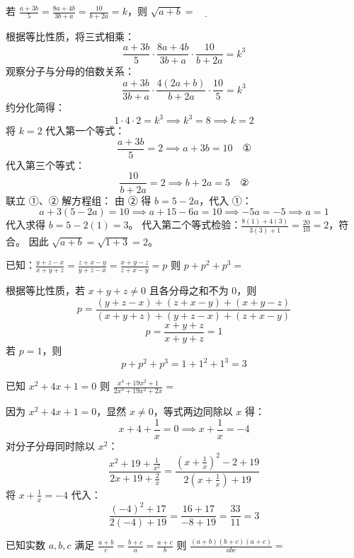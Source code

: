 \begin{questions}
\question
若 $\frac{a + 3b}{5} = \frac{8a + 4b}{3b + a} = \frac{10}{b + 2a} = k$，则 $\sqrt{a + b} = \underline{\qquad}$

\begin{solution}
根据等比性质，将三式相乘：
\[
\frac{a + 3b}{5} \cdot \frac{8a + 4b}{3b + a} \cdot \frac{10}{b + 2a} = k^3
\]
观察分子与分母的倍数关系：
\[
\frac{a + 3b}{3b + a} \cdot \frac{4(2a + b)}{b + 2a} \cdot \frac{10}{5} = k^3
\]
约分化简得：
\[
1 \cdot 4 \cdot 2 = k^3 \implies k^3 = 8 \implies k = 2
\]
将 $k = 2$ 代入第一个等式：
\[
\frac{a + 3b}{5} = 2 \implies a + 3b = 10 \quad \text{①}
\]
代入第三个等式：
\[
\frac{10}{b + 2a} = 2 \implies b + 2a = 5 \quad \text{②}
\]
联立 ①、② 解方程组：
由 ② 得 $b = 5 - 2a$，代入 ①：
\[
a + 3(5 - 2a) = 10 \implies a + 15 - 6a = 10 \implies -5a = -5 \implies a = 1
\]
代入求得 $b = 5 - 2(1) = 3$。
代入第二个等式检验：$\frac{8(1) + 4(3)}{3(3) + 1} = \frac{20}{10} = 2$，符合。
因此 $\sqrt{a + b} = \sqrt{1 + 3} = 2$。
\end{solution}

\question 已知：$\frac{y+z-x}{x+y+z} = \frac{z+x-y}{y+z-x} = \frac{x+y-z}{z+x-y} = p$
则 $p + p^2 + p^3 =$ \underline{\hspace{1cm}}

\begin{solution}
根据等比性质，若 $x+y+z \neq 0$ 且各分母之和不为 0，则
\[
p = \frac{(y+z-x) + (z+x-y) + (x+y-z)}{(x+y+z) + (y+z-x) + (z+x-y)}
\]
\[
p = \frac{x+y+z}{x+y+z} = 1
\]
若 $p = 1$，则
\[
p + p^2 + p^3 = 1 + 1^2 + 1^3 = 3
\]
\end{solution}

\question 已知 $x^2 + 4x + 1 = 0$
则 $\frac{x^4 + 19x^2 + 1}{2x^3 + 19x^2 + 2x} =$ \underline{\hspace{1cm}}

\begin{solution}
因为 $x^2 + 4x + 1 = 0$，显然 $x \neq 0$，等式两边同除以 $x$ 得：
\[
x + 4 + \frac{1}{x} = 0 \implies x + \frac{1}{x} = -4
\]
对分子分母同时除以 $x^2$：
\[
\frac{x^2 + 19 + \frac{1}{x^2}}{2x + 19 + \frac{2}{x}} = \frac{\left(x + \frac{1}{x}\right)^2 - 2 + 19}{2\left(x + \frac{1}{x}\right) + 19}
\]
将 $x + \frac{1}{x} = -4$ 代入：
\[
\frac{(-4)^2 + 17}{2(-4) + 19} = \frac{16 + 17}{-8 + 19} = \frac{33}{11} = 3
\]
\end{solution}

\question 已知实数 $a, b, c$ 满足 $\frac{a+b}{c} = \frac{b+c}{a} = \frac{a+c}{b}$
则 $\frac{(a+b)(b+c)(a+c)}{abc} =$ \underline{\hspace{1cm}}


\end{questions}
